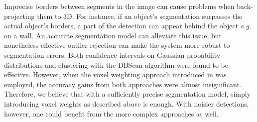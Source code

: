 Imprecise borders between segments in the image can cause problems when back-projecting them to 3D. For instance, if an object's segmentation surpasses the actual object's borders, a part of the detection can appear behind the object \textit{e.g.} on a wall. An accurate segmentation model can alleviate this issue, but nonetheless effective outlier rejection can make the system more robust to segmentation errors. Both confidence intervals on Gaussian probability distributions and clustering with the DBScan algorithm \cite{dbscan} were found to be effective. However, when the voxel weighting approach introduced in \cite{panopticfusion} was employed, the accuracy gains from both approaches were almost insignificant. Therefore, we believe that with a sufficiently precise segmentation model, simply introducing voxel weights as described above is enough. With noisier detections, however, one could benefit from the more complex approaches as well.